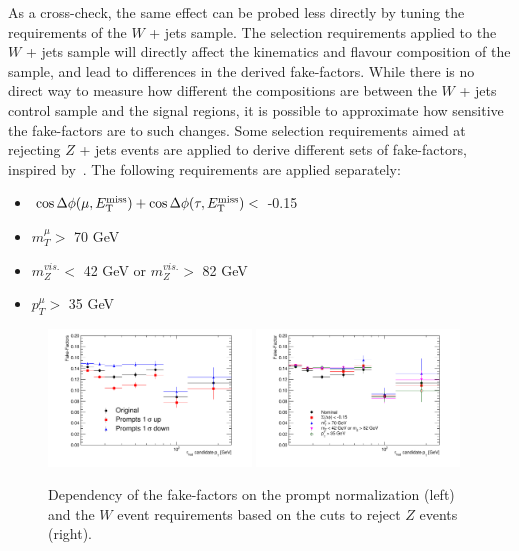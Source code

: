 As a cross-check, the same effect can be probed less directly by tuning the requirements
of the $W$ + jets sample. The selection requirements applied to the $W$ + jets sample will
directly affect the kinematics and flavour composition of the sample, and lead to
differences in the derived fake-factors. While there is no direct way to measure how
different the compositions are between the $W$ + jets control sample and the signal
regions, it is possible to approximate how sensitive the fake-factors are to such changes.
Some selection requirements aimed at rejecting $Z$ + jets events are applied to derive
different sets of fake-factors, inspired by~\cite{zttnote,tauidnote}.  The following
requirements are applied separately:

\begin{itemize}
\item $\cos{\Delta\phi(\mu, \ensuremath{E_{\text{T}}^{\text{miss}}})} + \cos{\Delta\phi(\tau, \ensuremath{E_{\text{T}}^{\text{miss}}})} <$ -0.15
\item $m_{T}^{\mu} >$ 70 GeV
\item $m_{Z}^{vis.} <$ 42 GeV or $m_{Z}^{vis.} >$ 82 GeV
\item $p_{T}^{\mu} >$ 35 GeV
\end{itemize}

\begin{figure}
\centering \includegraphics[width=0.48\textwidth]{figures/ch7-modelindependent/TauFakes_PromptsDep}
\centering \includegraphics[width=0.48\textwidth]{figures/ch7-modelindependent/TauFakes_CutsDep}
\caption{\label{fig:fakesys} Dependency of the fake-factors on the prompt normalization
  (left) and the $W$ event requirements based on the cuts to reject $Z$ events (right).}
\end{figure}

